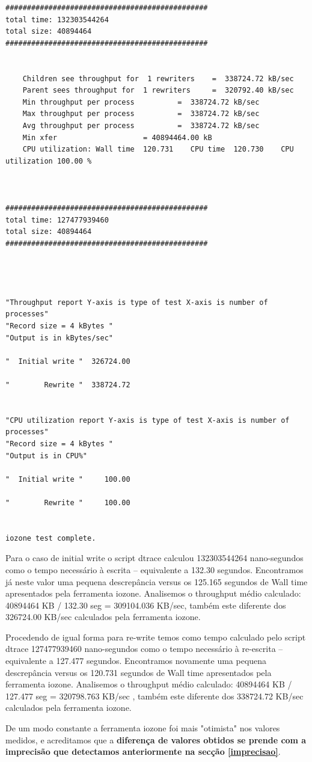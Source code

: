 \documentclass[a4paper]{article}
\begin{document}
{\begin{lstlisting}
###############################################
total time: 132303544264
total size: 40894464
###############################################


	Children see throughput for  1 rewriters 	=  338724.72 kB/sec
	Parent sees throughput for  1 rewriters 	=  320792.40 kB/sec
	Min throughput per process 			=  338724.72 kB/sec 
	Max throughput per process 			=  338724.72 kB/sec
	Avg throughput per process 			=  338724.72 kB/sec
	Min xfer 					= 40894464.00 kB
	CPU utilization: Wall time  120.731    CPU time  120.730    CPU utilization 100.00 %



###############################################
total time: 127477939460
total size: 40894464
###############################################




"Throughput report Y-axis is type of test X-axis is number of processes"
"Record size = 4 kBytes "
"Output is in kBytes/sec"

"  Initial write "  326724.00 

"        Rewrite "  338724.72 


"CPU utilization report Y-axis is type of test X-axis is number of processes"
"Record size = 4 kBytes "
"Output is in CPU%"

"  Initial write "     100.00 

"        Rewrite "     100.00 


iozone test complete.
\end{lstlisting}

Para o caso de initial write o script dtrace calculou 132303544264 nano-segundos como o tempo necessário à escrita -- equivalente a 132.30 segundos. Encontramos já neste valor uma pequena descrepância versus os 125.165 segundos de Wall time apresentados pela ferramenta iozone. Analisemos o throughput médio calculado: 40894464 KB / 132.30 seg = 309104.036 KB/sec, também este diferente dos 326724.00 KB/sec calculados pela ferramenta iozone. \par 
Procedendo de igual forma para re-write temos como tempo calculado pelo script dtrace 127477939460 nano-segundos como o tempo necessário à re-escrita -- equivalente a 127.477 segundos.  
Encontramos novamente  uma pequena descrepância versus os 120.731 segundos de Wall time apresentados pela ferramenta iozone. Analisemos o throughput médio calculado: 40894464 KB / 127.477 seg = 320798.763 KB/sec , também este diferente dos 338724.72 KB/sec calculados pela ferramenta iozone. \par
De um modo constante a ferramenta iozone foi mais "otimista" nos valores medidos, e acreditamos que a \textbf{diferença de valores obtidos se prende com a imprecisão que detectamos anteriormente na secção \ref{imprecisao}}.
\newpage
}
\end{document}
